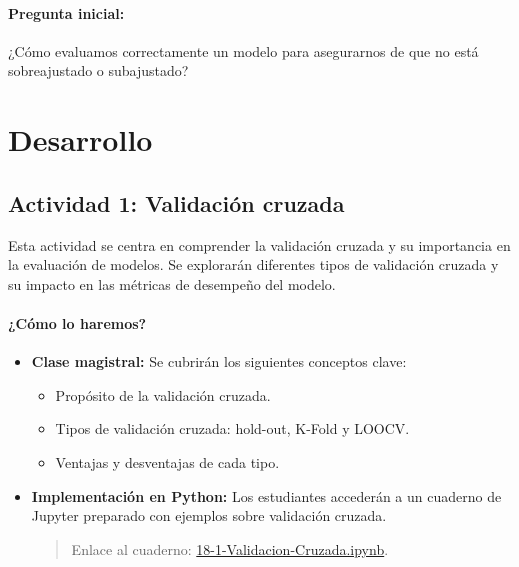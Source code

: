 \documentclass[a4,11pt]{aleph-notas}
\begin{document}
\paragraph{Pregunta inicial:} 
¿Cómo evaluamos correctamente un modelo para asegurarnos de que no está sobreajustado o subajustado?



\section*{Desarrollo}

\subsection*{Actividad 1: Validación cruzada}

Esta actividad se centra en comprender la validación cruzada y su importancia en la evaluación de modelos. Se explorarán diferentes tipos de validación cruzada y su impacto en las métricas de desempeño del modelo.

\paragraph{¿Cómo lo haremos?}  
\begin{itemize}[leftmargin=*]
    \item \textbf{Clase magistral:} Se cubrirán los siguientes conceptos clave:
    \begin{itemize}
        \item Propósito de la validación cruzada.
        \item Tipos de validación cruzada: hold-out, K-Fold y LOOCV.
        \item Ventajas y desventajas de cada tipo.
    \end{itemize}
    \item \textbf{Implementación en Python:} Los estudiantes accederán a un cuaderno de Jupyter preparado con ejemplos sobre validación cruzada.
    \begin{quote}
        Enlace al cuaderno: \href{https://colab.research.google.com/github/andres-merino/AprendizajeAutomaticoInicial-05-N0105/blob/main/2-Notebooks/18-1-Validacion-Cruzada.ipynb}{18-1-Validacion-Cruzada.ipynb}.
    \end{quote}
\end{itemize}
\end{document}
